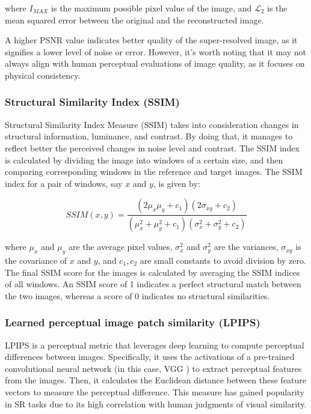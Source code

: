             where $I_{MAX}$ is the maximum possible pixel value of the image, and $\mathcal{L}_2$ is the mean squared error between the original and the reconstructed image.
            
            A higher PSNR value indicates better quality of the super-resolved image, as it signifies a lower level of noise or error. However, it's worth noting that it may not always align with human perceptual evaluations of image quality, as it focuses on physical consistency.

        \subsubsection{Structural Similarity Index (SSIM)}

            
        Structural Similarity Index Measure (SSIM) takes into consideration changes in structural information, luminance, and contrast. By doing that, it manages to reflect better the perceived changes in noise level and contrast.
        The SSIM index is calculated by dividing the image into windows of a certain size, and then comparing corresponding windows in the reference and target images. The SSIM index for a pair of windows, say $x$ and $y$, is given by:
        
        \begin{equation}
            SSIM(x, y) = \frac{(2\mu_x\mu_y + c_1)(2\sigma_{xy} + c_2)}{(\mu_x^2 + \mu_y^2 + c_1)(\sigma_x^2 + \sigma_y^2 + c_2)}
        \end{equation}
        
        where $\mu_x$ and $\mu_y$ are the average pixel values, $\sigma_x^2$ and $\sigma_y^2$ are the variances, $\sigma_{xy}$ is the covariance of $x$ and $y$, and $c_1, c_2$ are small constants to avoid division by zero.
        The final SSIM score for the images is calculated by averaging the SSIM indices of all windows. An SSIM score of 1 indicates a perfect structural match between the two images, whereas a score of 0 indicates no structural similarities.

        \subsubsection{Learned perceptual image patch similarity (LPIPS)}

        LPIPS is a perceptual metric that leverages deep learning to compute perceptual differences between images. Specifically, it uses the activations of a pre-trained convolutional neural network (in this case, VGG \cite{VGGnet} ) to extract perceptual features from the images. 
        Then, it calculates the Euclidean distance between these feature vectors to measure the perceptual difference.
        This measure has gained popularity in SR tasks due to its high correlation with human judgments of visual similarity.
        
